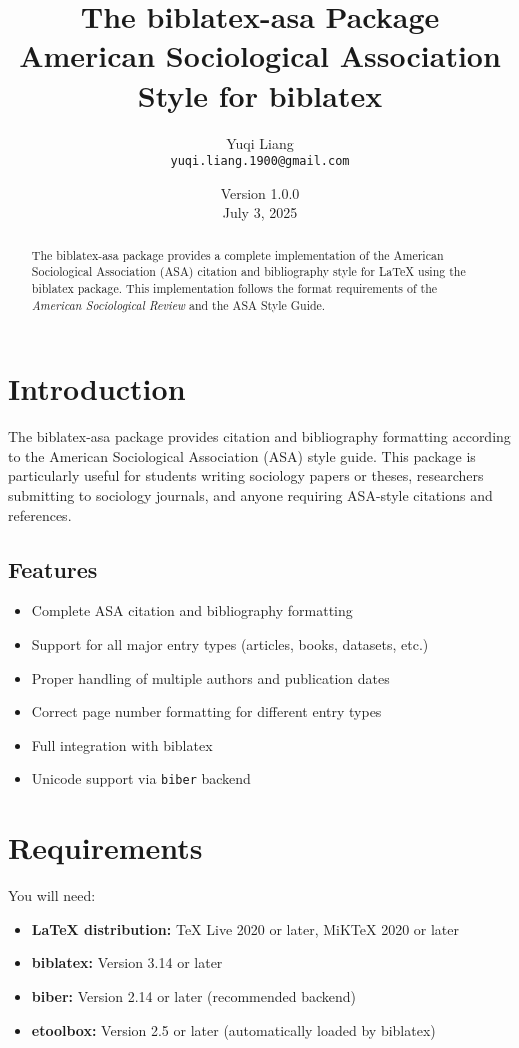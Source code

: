\documentclass[11pt,a4paper]{ltxdoc}
\title{The \textsf{biblatex-asa} Package\\
       \Large American Sociological Association Style for \textsf{biblatex}}
\author{Yuqi Liang\\
        \texttt{yuqi.liang.1900@gmail.com}}
\date{Version 1.0.0\\July 3, 2025}
\begin{document}
\maketitle

\begin{abstract}
The \textsf{biblatex-asa} package provides a complete implementation of the American Sociological Association (ASA) citation and bibliography style for LaTeX using the \textsf{biblatex} package. This implementation follows the format requirements of the \emph{American Sociological Review} and the ASA Style Guide.
\end{abstract}

\tableofcontents

\section{Introduction}

The \textsf{biblatex-asa} package provides citation and bibliography formatting according to the American Sociological Association (ASA) style guide. This package is particularly useful for students writing sociology papers or theses, researchers submitting to sociology journals, and anyone requiring ASA-style citations and references.

\subsection{Features}

\begin{itemize}
  \item Complete ASA citation and bibliography formatting
  \item Support for all major entry types (articles, books, datasets, etc.)
  \item Proper handling of multiple authors and publication dates
  \item Correct page number formatting for different entry types
  \item Full integration with \textsf{biblatex}
  \item Unicode support via \texttt{biber} backend
\end{itemize}

\section{Requirements}

You will need:

\begin{itemize}
  \item \textbf{LaTeX distribution:} TeX Live 2020 or later, MiKTeX 2020 or later
  \item \textbf{biblatex:} Version 3.14 or later
  \item \textbf{biber:} Version 2.14 or later (recommended backend)
  \item \textbf{etoolbox:} Version 2.5 or later (automatically loaded by biblatex)
\end{itemize}
\end{document}
